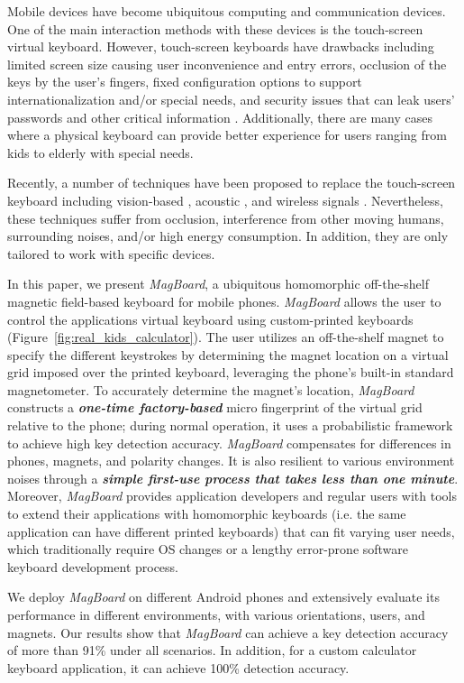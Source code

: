 \documentclass[conference]{IEEEtran}
\def \sys {\textit{MagBoard}}
\begin{document}
Mobile devices have become ubiquitous computing and communication devices. One of the main interaction methods with these devices is the touch-screen virtual keyboard. However, touch-screen keyboards have drawbacks including limited screen size causing user inconvenience and entry errors, occlusion of the keys by the user's fingers, fixed configuration options to support internationalization and/or special needs, and security issues that can leak users' passwords and other critical information \cite{wang2015mole}. Additionally, there are many cases where a physical keyboard can provide better experience for users ranging from kids to elderly with special needs.

Recently, a number of techniques have been proposed to replace the touch-screen keyboard including vision-based \cite{balzarotti2008clearshot}, acoustic \cite{zhu2014context,wang2014ubiquitous}, and wireless signals \cite{ali2015wikey}. Nevertheless, these techniques suffer from occlusion, interference from other moving humans, surrounding noises, and/or high energy consumption. In addition, they are only tailored to work with specific devices.

In this paper, we present \sys{}, a ubiquitous homomorphic off-the-shelf magnetic field-based keyboard for mobile phones. \sys{} allows the user to control the applications virtual keyboard using custom-printed keyboards (Figure~\ref{fig:real_kids_calculator}). The user utilizes an off-the-shelf magnet to specify the different keystrokes by determining the magnet location on a virtual grid imposed over the printed keyboard, leveraging the phone's built-in standard magnetometer. To accurately determine the magnet's location, \sys{} constructs a \textbf{\emph{one-time factory-based}} micro fingerprint of the virtual grid relative to the phone; during normal operation, it uses a probabilistic framework to achieve high key detection accuracy. \sys{} compensates for differences in phones, magnets, and polarity changes. It is also resilient to various environment noises through a \textbf{\emph{simple first-use process that takes less than one minute}}. Moreover, \sys{} provides application developers and regular users with tools to extend their applications with homomorphic keyboards (i.e. the same application can have different printed keyboards) that can fit varying user needs, which traditionally require OS changes or a lengthy error-prone software keyboard development process.

We deploy \sys{} on different Android phones and extensively evaluate its performance in different environments, with various orientations, users, and magnets. Our results show that \sys{} can achieve a key detection accuracy of more than 91\% under all scenarios. In addition, for a custom calculator keyboard application, it can achieve 100\% detection accuracy.
\end{document}
